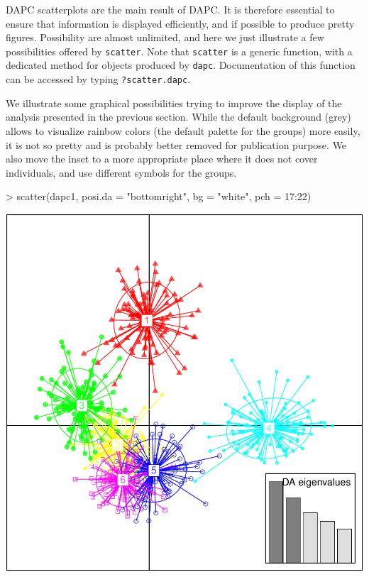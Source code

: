 \documentclass{article}
\begin{document}
DAPC scatterplots are the main result of DAPC. It is therefore essential to ensure that information
is displayed efficiently, and if possible to produce pretty figures.
Possibility are almost unlimited, and here we just illustrate a few possibilities offered by
\texttt{scatter}. Note that \texttt{scatter} is a generic function, with a dedicated method for
objects produced by \texttt{dapc}. Documentation of this function can be accessed by typing \texttt{?scatter.dapc}.

We illustrate some graphical possibilities trying to improve the display of the analysis presented
in the previous section.
While the default background (grey) allows to visualize rainbow colors (the default palette for the
groups) more easily, it is not so pretty and is probably better removed for publication purpose.
We also move the inset to a more appropriate place where it does not cover individuals, and use
different symbols for the groups.

\begin{Schunk}
\begin{Sinput}
> scatter(dapc1, posi.da = "bottomright", bg = "white", pch = 17:22)
\end{Sinput}
\end{Schunk}
\includegraphics{figs/dapc-011}
\end{document}
